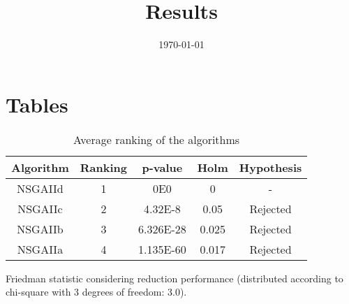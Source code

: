 \documentclass{article}
\title{Results}
\author{}
\date{\today}
\begin{document}
\oddsidemargin 0in \topmargin 0in\maketitle

\section{Tables}
\begin{table}[!htp]
\centering
\begin{tabular}{c|c|c|c|c}
Algorithm&Ranking&p-value&Holm&Hypothesis\\
\hline
NSGAIId & 1 & 0E0 & 0 & -\\
NSGAIIc & 2 & 4.32E-8 & 0.05 & Rejected\\
NSGAIIb & 3 & 6.326E-28 & 0.025 & Rejected\\
NSGAIIa & 4 & 1.135E-60 & 0.017 & Rejected\\
\end{tabular}
\caption{Average ranking of the algorithms}
\end{table}


Friedman statistic considering reduction performance (distributed according to chi-square with 3 degrees of freedom: 3.0).
\end{document}
